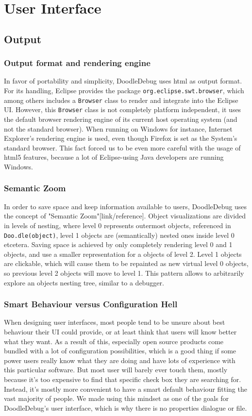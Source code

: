 \documentclass{report}
\begin{document}
\chapter*{User Interface}
\section*{Output}
\subsection*{Output format and rendering engine}
In favor of portability and simplicity, DoodleDebug uses html as output format. For its handling, Eclipse provides the package \verb-org.eclipse.swt.browser-, which among others includes a \verb.Browser. class to render and integrate into the Eclipse UI. However, this \verb.Browser. class is not completely platform independent, it uses the default browser rendering engine of its current host operating system (and not the standard browser). When running on Windows for instance, Internet Explorer's rendering engine is used, even though Firefox is set as the System's standard browser. This fact forced us to be even more careful with the usage of html5 features, because a lot of Eclipse-using Java developers are running Windows.

\subsection*{Semantic Zoom}
In order to save space and keep information available to users, DoodleDebug uses the concept of "Semantic Zoom"[link/reference]. Object visualizations are divided in levels of nesting, where level 0 represents outermost objects, referenced in \verb-Doo.dle(object)-, level 1 objects are (semantically) nested ones inside level 0 etcetera. Saving space is achieved by only completely rendering level 0 and 1 objects, and use a smaller representation for a objects of level 2. Level 1 objects are clickable, which will cause them to be repainted as new virtual level 0 objects, so previous level 2 objects will move to level 1. This pattern allows to arbitrarily explore an objects nesting tree, similar to a debugger.

\subsection*{Smart Behaviour versus Configuration Hell}
When designing user interfaces, most people tend to be unsure about best behaviour their UI could provide, or at least think that users will know better what they want. As a result of this, especially open source products come bundled with a lot of configuration possibilities, which is a good thing if some power users really know what they are doing and have lots of experience with this particular software. But most user will barely ever touch them, mostly because it's too expensive to find that specific check box they are searching for. Instead, it's mostly more convenient to have a smart default behaviour fitting the vast majority of people. We made using this mindset as one of the goals for DoodleDebug's user interface, which is why there is no properties dialogue or file.
\end{document}
